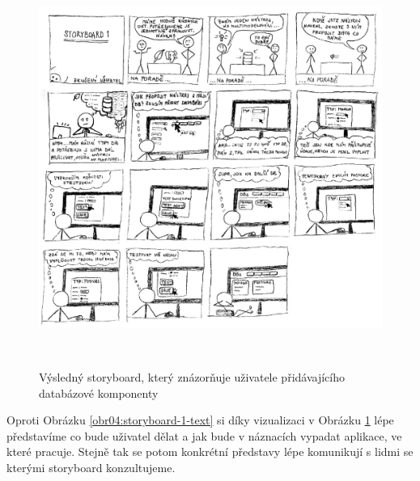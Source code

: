 \begin{figure}[htb]
    \centering
    \includegraphics[height=130mm]{../img/storyboard-1}
    \caption{\centering Výsledný storyboard, který znázorňuje uživatele přidávajícího databázové komponenty}
    \label{obr04:storyboard-1}
\end{figure}

Oproti Obrázku \ref{obr04:storyboard-1-text} si díky vizualizaci v Obrázku \ref{obr04:storyboard-1} lépe představíme co bude uživatel dělat a jak bude v náznacích vypadat aplikace, ve které pracuje. Stejně tak se potom konkrétní představy lépe komunikují s lidmi se kterými storyboard konzultujeme.
